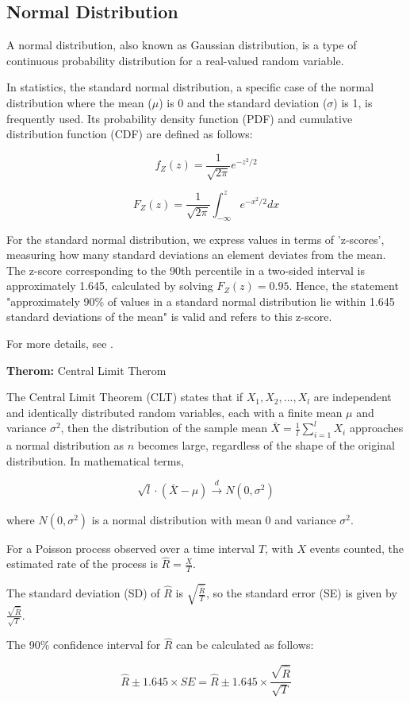 \subsection{Normal Distribution}

A normal distribution, also known as Gaussian distribution, is a type of continuous probability distribution for a real-valued random variable. 

In statistics, the standard normal distribution, a specific case of the normal distribution where the mean ($\mu$) is 0 and the standard deviation ($\sigma$) is 1, is frequently used. Its probability density function (PDF) and cumulative distribution function (CDF) are defined as follows:

\[
f_Z(z) = \frac{1}{\sqrt{2\pi}} e^{-z^2/2}
\]

\[
F_Z(z) = \frac{1}{\sqrt{2\pi}} \int_{-\infty}^{z} e^{-x^2/2} dx
\]

For the standard normal distribution, we express values in terms of 'z-scores', measuring how many standard deviations an element deviates from the mean. The z-score corresponding to the 90th percentile in a two-sided interval is approximately 1.645, calculated by solving $F_Z(z) = 0.95$. Hence, the statement "approximately 90\% of values in a standard normal distribution lie within 1.645 standard deviations of the mean" is valid and refers to this z-score.

For more details, see \cite{decarlo1997}. 

\begin{mdframed}[backgroundcolor=gray_background, linewidth=0pt]
    \textbf{Therom:} Central Limit Therom

    The Central Limit Theorem (CLT) states that if $X_1, X_2, ..., X_l$ are independent and identically distributed random variables, each with a finite mean $\mu$ and variance $\sigma^2$, then the distribution of the sample mean $\bar{X} = \frac{1}{l} \sum_{i=1}^{l} X_i$ approaches a normal distribution as $n$ becomes large, regardless of the shape of the original distribution. In mathematical terms,

    \[
    \sqrt{l} \cdot (\bar{X}-\mu) \xrightarrow[]{d} N(0, \sigma^2)
    \]
    
    where $N(0, \sigma^2)$ is a normal distribution with mean 0 and variance $\sigma^2$.
    
\end{mdframed}


For a Poisson process observed over a time interval $T$, with $X$ events counted, the estimated rate of the process is $\hat{R} = \frac{X}{T}$.

The standard deviation (SD) of $\hat{R}$ is $\sqrt{\frac{\hat{R}}{T}}$, so the standard error (SE) is given by $\frac{\sqrt{\hat{R}}}{\sqrt{T}}$. 

The 90\% confidence interval for $\hat{R}$ can be calculated as follows:

\[
\hat{R} \pm 1.645 \times SE = \hat{R} \pm 1.645 \times \frac{\sqrt{\hat{R}}}{\sqrt{T}}
\]
